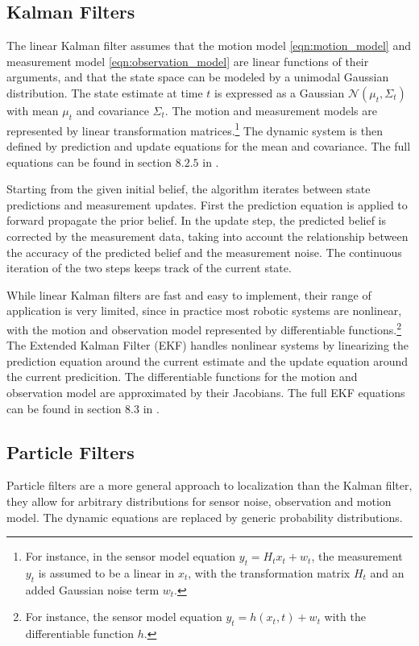 \documentclass[10pt,journal,compsoc]{IEEEtran}
\begin{document}
\subsection{Kalman Filters}
The linear Kalman filter assumes that the motion model \ref{eqn:motion_model} and measurement model \ref{eqn:observation_model} are linear functions of their arguments, and that the state space can be modeled by a unimodal Gaussian distribution. The state estimate at time $t$ is expressed as a Gaussian $\mathcal{N}\left(\mu_t , \Sigma_t \right)$ with mean $\mu_t$ and covariance $\Sigma_t$. The motion and measurement models are represented by linear transformation matrices.\footnote{For instance, in the sensor model equation $y_t  = H_t x_t + w_t$, the measurement $y_t$ is assumed to be a linear in $x_t$, with the transformation matrix $H_t$ and an added Gaussian noise term $w_t$.} The dynamic system is then defined by prediction and update equations for the mean and covariance. The full equations can be found in section $8.2.5$ in \cite{principles_of_robot_motion}.

Starting from the given initial belief, the algorithm iterates between state predictions and measurement updates. First the prediction equation is applied to forward propagate the prior belief. In the update step, the predicted belief is corrected by the measurement data, taking into account the relationship between the accuracy of the predicted belief and the measurement noise. The continuous iteration of the two steps keeps track of the current state.

While linear Kalman filters are fast and easy to implement, their range of application is very limited, since in practice most robotic systems are nonlinear, with the motion and observation model represented by differentiable functions.\footnote{For instance, the sensor model equation $y_t = h\left(x_t, t \right) + w_t$ with the differentiable function $h$.} The Extended Kalman Filter (EKF) handles nonlinear systems by linearizing the prediction equation around the current estimate and the update equation around the current predicition. The differentiable functions for the motion and observation model are approximated by their Jacobians. The full EKF equations can be found in section $8.3$ in \cite{principles_of_robot_motion}.

\subsection{Particle Filters}
Particle filters are a more general approach to localization than the Kalman filter, they allow for arbitrary distributions for sensor noise, observation and motion model. The dynamic equations are replaced by generic probability distributions.
\end{document}

